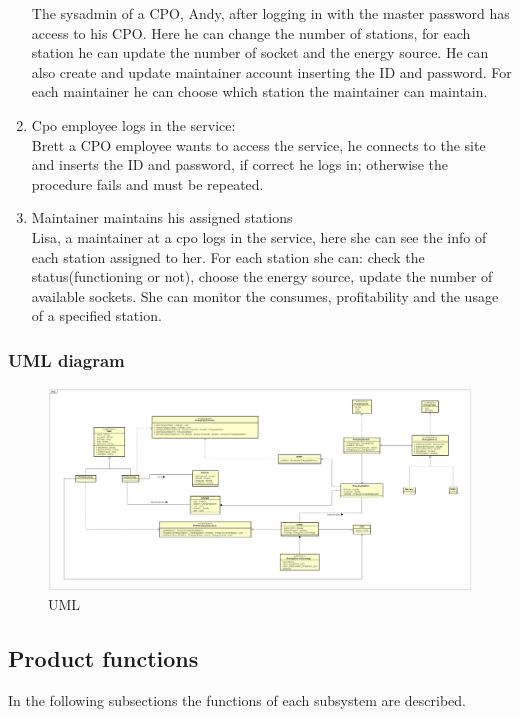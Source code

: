 \begin{enumerate}[label=\textbf{S\arabic*}]
            The sysadmin of a CPO, Andy, after logging in with the master password has access to his CPO.
            Here he can change the number of stations, for each station he can update the number of socket and the energy source.
            He can also create and update maintainer account inserting the ID and password. For each maintainer he can choose which station the maintainer can maintain.
      \item Cpo employee logs in the service:\\
            Brett a CPO employee wants to access the service, he connects to the site and inserts the ID
            and password, if correct he logs in; otherwise the procedure fails and must be repeated.
      \item Maintainer maintains his assigned stations\\
            Lisa, a maintainer at a cpo logs in the service, here she can see the info of each station assigned to her.
            For each station she can: check the status(functioning or not), choose the energy source, update the number of available sockets.
            She can monitor the consumes, profitability and the usage of a specified station.
\end{enumerate}

\clearpage
\subsubsection{UML diagram}
\begin{figure}[h!]
      \begin{center}
            \includegraphics[keepaspectratio, width=16cm]{UML.png}
            \caption{UML}
      \end{center}
\end{figure}

\subsection{Product functions}
In the following subsections the functions of each subsystem are described.

